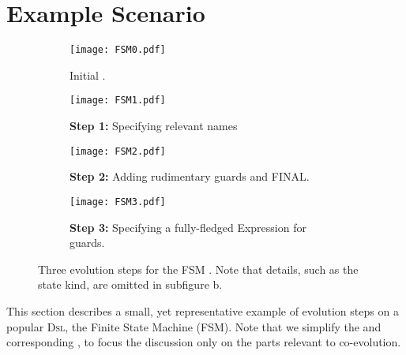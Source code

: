 \section{Example Scenario}
\label{sec:Example}

\begin{figure*}
    \centering
    \begin{subfigure}[b]{0.45\textwidth}
			\centering
      \texttt{[image: FSM0.pdf]}
      \caption{Initial \metamodel.}
      \label{fig:FSM:Init}
    \end{subfigure}
    \hfill
    \begin{subfigure}[b]{0.45\textwidth}
			\centering
      \texttt{[image: FSM1.pdf]}
      \caption{\textbf{Step 1:} Specifying relevant \textsf{name}s}
      \label{fig:FSM:Relevant}
    \end{subfigure}
    \hfill
    \begin{subfigure}[b]{0.45\textwidth}
			\centering
      \texttt{[image: FSM2.pdf]}
      \caption{\textbf{Step 2:} Adding rudimentary guards and \textsf{FINAL}.}
      \label{fig:FSM:Guard}
    \end{subfigure}
    \hfill 
		\begin{subfigure}[b]{0.45\textwidth}
			\centering
      \texttt{[image: FSM3.pdf]}
      \caption{\textbf{Step 3:} Specifying a fully-fledged \textsf{Expression} for \textsf{guard}s.}
      \label{fig:FSM:Expression}
    \end{subfigure}
    \caption{Three evolution steps for the \textsf{FSM} \metamodel. Note that details, such as the state kind, are omitted in subfigure b.}%
    \label{fig:FSM}
\end{figure*}

This section describes a small, yet representative example of \metamodel
evolution steps on a popular \textsc{Dsl}, the Finite State Machine (\textsf{FSM}).
Note that we simplify the \metamodels and corresponding \viewtypes, to focus 
the discussion only on the parts relevant to co-evolution. 

